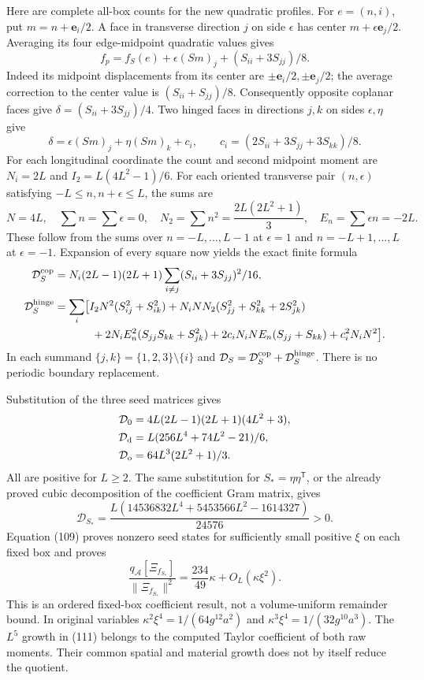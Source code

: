 \documentclass[11pt]{article}
\begin{document}
Here are complete all-box counts for the new quadratic profiles.
For $e=(n,i)$, put $m=n+\mathbf e_i/2$.
A face in transverse direction $j$ on side $\epsilon$ has center
$m+\epsilon\mathbf e_j/2$. Averaging its four edge-midpoint quadratic
values gives
\[
 f_p=f_S(e)+\epsilon(Sm)_j+(S_{ii}+3S_{jj})/8.
\]
Indeed its midpoint displacements from its center are
$\pm\mathbf e_i/2,\pm\mathbf e_j/2$; the average correction to the
center value is $(S_{ii}+S_{jj})/8$.
Consequently opposite coplanar faces give
$\delta=(S_{ii}+3S_{jj})/4$.
Two hinged faces in directions $j,k$ on sides $\epsilon,\eta$ give
\[
 \delta=\epsilon(Sm)_j+\eta(Sm)_k+c_i,\qquad
 c_i=(2S_{ii}+3S_{jj}+3S_{kk})/8 .
\]
For each longitudinal coordinate the count and second midpoint moment
are $N_i=2L$ and $I_2=L(4L^2-1)/6$.
For each oriented transverse pair $(n,\epsilon)$ satisfying
$-L\le n,n+\epsilon\le L$, the sums are
\[
 N=4L,\quad \sum n=\sum\epsilon=0,\quad
 N_2=\sum n^2=\frac{2L(2L^2+1)}3,\quad
 E_n=\sum\epsilon n=-2L .
\]
These follow from the sums over $n=-L,\ldots,L-1$ at $\epsilon=1$
and $n=-L+1,\ldots,L$ at $\epsilon=-1$.
Expansion of every square now yields the exact finite formula
\begin{align*}
 \mathcal D_S^{\rm cop}&=N_i(2L-1)(2L+1)
                  \sum_{i\ne j}(S_{ii}+3S_{jj})^2/16,\\
 \mathcal D_S^{\rm hinge}
 &=\sum_i\bigl[
 I_2N^2(S_{ij}^2+S_{ik}^2)
 +N_iNN_2(S_{jj}^2+S_{kk}^2+2S_{jk}^2)\\
 &\hspace{12mm}+2N_iE_n^2(S_{jj}S_{kk}+S_{jk}^2)
 +2c_iN_iNE_n(S_{jj}+S_{kk})+c_i^2N_iN^2\bigr].
\end{align*}
In each summand $\{j,k\}=\{1,2,3\}\setminus\{i\}$ and
$\mathcal D_S=\mathcal D_S^{\rm cop}+\mathcal D_S^{\rm hinge}$.
There is no periodic boundary replacement.

Substitution of the three seed matrices gives
\begin{align}
 \mathcal D_0&=4L(2L-1)(2L+1)(4L^2+3),\nonumber\\
 \mathcal D_{\rm d}&=L(256L^4+74L^2-21)/6,\nonumber\\
 \mathcal D_{\rm o}&=64L^3(2L^2+1)/3.\label{eq:fabel-three-D}
\end{align}
All are positive for $L\ge2$.
The same substitution for $S_*=\eta\eta^{\mathsf T}$, or the already
proved cubic decomposition of the coefficient Gram matrix, gives
\begin{equation}\label{eq:fabel-rank-one-D}
 \mathcal D_{S_*}
 =\frac{L(14536832L^4+5453566L^2-1614327)}{24576}>0 .
\end{equation}
Equation (109) proves nonzero seed states for
sufficiently small positive $\xi$ on each fixed box and proves
\[
 \frac{q_{\mathcal A}[\Xi_{f_{S_*}}]}{\|\Xi_{f_{S_*}}\|^2}
       =\frac{234}{49}\kappa+O_L(\kappa\xi^2).
\]
This is an ordered fixed-box coefficient result, not a volume-uniform
remainder bound. In original variables
$\kappa^2\xi^4=1/(64g^{12}a^2)$ and
$\kappa^3\xi^4=1/(32g^{10}a^3)$.
The $L^5$ growth in (111) belongs to the computed
Taylor coefficient of both raw moments. Their common spatial and
material growth does not by itself reduce the quotient.
\end{document}
